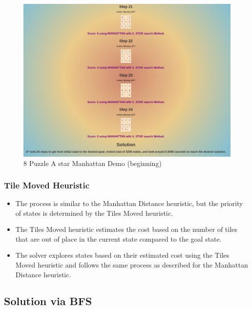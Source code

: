 \documentclass[12pt]{article}
\begin{document}
\begin{figure}[h]
  \centerline{\includegraphics[width = 150mm]{Sliding_Output_M_A_n.png}}
  \caption{8 Puzzle A star Manhattan Demo (beginning)}
  \label{fig}
\end{figure}

\clearpage
\subsubsection*{Tile Moved Heuristic}
\begin{itemize}
    \item The process is similar to the Manhattan Distance heuristic, but the priority of states is determined by the Tiles Moved heuristic.
    \item The Tiles Moved heuristic estimates the cost based on the number of tiles that are out of place in the current state compared to the goal state.
    \item The solver explores states based on their estimated cost using the Tiles Moved heuristic and follows the same process as described for the Manhattan Distance heuristic.
\end{itemize}

\subsection{Solution via BFS}
\end{document}
